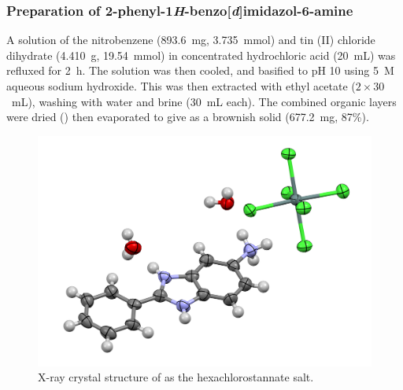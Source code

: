 \subsubsection{Preparation of 2-phenyl-1\emph{H}-benzo[\emph{d}]imidazol-6-amine }
A solution of the nitrobenzene  (893.6~mg, 3.735~mmol) and tin (II) chloride dihydrate (4.410~g, 19.54~mmol) in concentrated hydrochloric acid (20~mL) was refluxed for 2~h. 
The solution was then cooled, and basified to pH 10 using 5~M aqueous sodium hydroxide.
This was then extracted with ethyl acetate ($2\times30$~mL), washing with water and brine (30~mL each).
The combined organic layers were dried () then evaporated to give  as a brownish solid (677.2~mg, 87\%).

\begin{figure}[h]
    \centering
    \includegraphics[width=0.8\linewidth]{Figures/rhs-amine-xray.png}
    \caption{X-ray crystal structure of  as the hexachlorostannate salt.}
    \label{fig:rhs-amine-xray}
\end{figure}

